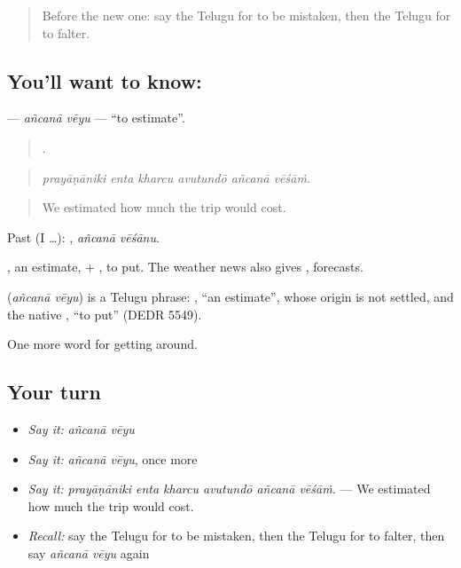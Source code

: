 \label{lesson:TE-C492-ancana-veyu}



\begin{quote}
Before the new one: say the Telugu for to be mistaken, then the Telugu for to falter.
\end{quote}

\subsection*{You'll want to know:  }
\textbf{ } — \emph{añcanā vēyu} — \textquotedblleft{}to estimate\textquotedblright{}.

\begin{quote}
     .
\end{quote}

\begin{quote}
\emph{prayāṇāniki enta kharcu avutundō añcanā vēśāṁ.}
\end{quote}

\begin{quote}
We estimated how much the trip would cost.
\end{quote}

Past (I …):  , \emph{añcanā vēśānu}.

, an estimate, + , to put. The weather news also gives , forecasts.

\begin{cousinweb}
\textbf{ } (\emph{añcanā vēyu}) is a Telugu phrase: , \textquotedblleft{}an estimate\textquotedblright{}, whose origin is not settled, and the native , \textquotedblleft{}to put\textquotedblright{} (DEDR 5549).
\end{cousinweb}

\begin{grammarlens}[title={What you've built}]
One more word for getting around.
\end{grammarlens}

\subsection*{Your turn}
\begin{itemize}
\raggedright
  \item \emph{Say it:} \emph{añcanā vēyu}
  \item \emph{Say it:} \emph{añcanā vēyu}, once more
  \item \emph{Say it:} \emph{prayāṇāniki enta kharcu avutundō añcanā vēśāṁ.} — We estimated how much the trip would cost.
  \item \emph{Recall:} say the Telugu for to be mistaken, then the Telugu for to falter, then say \emph{añcanā vēyu} again
\end{itemize}


